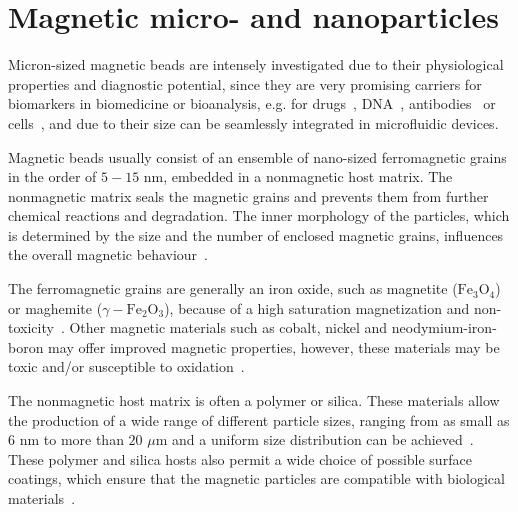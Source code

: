 
\section{Magnetic micro- and nanoparticles}\label{sec:magneticMicroparticleAndNanoparticle}
Micron-sized magnetic beads are intensely investigated due to their physiological properties and diagnostic potential, since they are very promising carriers for biomarkers in biomedicine or bioanalysis, e.g. for drugs~\cite{Safarik2002,Schuster2000}, DNA~\cite{Vuosku2004,Yeung2006}, antibodies~\cite{Guesdon1977} or cells~\cite{McCloskey2003,Zborowski2011}, and due to their size can be seamlessly integrated in microfluidic devices.

Magnetic beads usually consist of an ensemble of nano-sized ferromagnetic grains in the order of $5-15$ nm, embedded in a nonmagnetic host matrix. The nonmagnetic matrix seals the magnetic grains and prevents them from further chemical reactions and degradation. The inner morphology of the particles, which is determined by the size and the number of enclosed magnetic grains, influences the overall magnetic behaviour~\cite{Osawa1988,Leslie-Pelecky1996}. 

The ferromagnetic grains are generally an iron oxide, such as magnetite ($\textrm{Fe}_{3}\textrm{O}_{4}$) or maghemite ($\gamma-\textrm{Fe}_{2}\textrm{O}_{3}$), because of a high saturation magnetization and non-toxicity~\cite{Haefeli1999,Mueller2004}. Other magnetic materials such as cobalt, nickel and neodymium-iron-boron may offer improved magnetic properties, however, these materials may be toxic and/or susceptible to oxidation~\cite{Vadala2005}.

The nonmagnetic host matrix is often a polymer or silica. These materials allow the production of a wide range of different particle sizes, ranging from as small as $6$ nm to more than $20$ $\mu$m and a uniform size distribution can be achieved~\cite{Park2005,Horak2007,Bourlinos2001}. These polymer and silica hosts also permit a wide choice of possible surface coatings, which ensure that the magnetic particles are compatible with biological materials~\cite{Yeung2006,Jaffrezic-Renault2007,Tartaj2003}.


